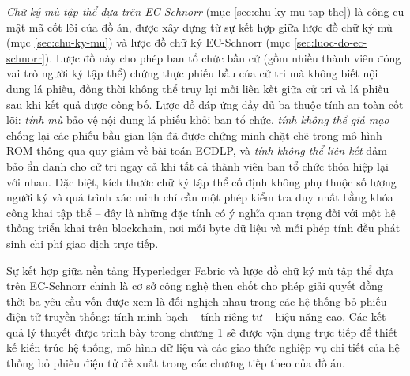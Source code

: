 \textit{Chữ ký mù tập thể dựa trên EC-Schnorr} (mục \ref{sec:chu-ky-mu-tap-the}) là công cụ mật mã cốt lõi của đồ án, được xây dựng từ sự kết hợp giữa lược đồ chữ ký mù (mục \ref{sec:chu-ky-mu}) và lược đồ chữ ký EC-Schnorr (mục \ref{sec:luoc-do-ec-schnorr}). Lược đồ này cho phép ban tổ chức bầu cử (gồm nhiều thành viên đóng vai trò người ký tập thể) chứng thực phiếu bầu của cử tri mà không biết nội dung lá phiếu, đồng thời không thể truy lại mối liên kết giữa cử tri và lá phiếu sau khi kết quả được công bố. Lược đồ đáp ứng đầy đủ ba thuộc tính an toàn cốt lõi: \textit{tính mù} bảo vệ nội dung lá phiếu khỏi ban tổ chức, \textit{tính không thể giả mạo} chống lại các phiếu bầu gian lận đã được chứng minh chặt chẽ trong mô hình ROM thông qua quy giảm về bài toán ECDLP, và \textit{tính không thể liên kết} đảm bảo ẩn danh cho cử tri ngay cả khi tất cả thành viên ban tổ chức thỏa hiệp lại với nhau. Đặc biệt, kích thước chữ ký tập thể cố định không phụ thuộc số lượng người ký và quá trình xác minh chỉ cần một phép kiểm tra duy nhất bằng khóa công khai tập thể -- đây là những đặc tính có ý nghĩa quan trọng đối với một hệ thống triển khai trên blockchain, nơi mỗi byte dữ liệu và mỗi phép tính đều phát sinh chi phí giao dịch trực tiếp.

Sự kết hợp giữa nền tảng Hyperledger Fabric và lược đồ chữ ký mù tập thể dựa trên EC-Schnorr chính là cơ sở công nghệ then chốt cho phép giải quyết đồng thời ba yêu cầu vốn được xem là đối nghịch nhau trong các hệ thống bỏ phiếu điện tử truyền thống: tính minh bạch -- tính riêng tư -- hiệu năng cao. Các kết quả lý thuyết được trình bày trong chương 1 sẽ được vận dụng trực tiếp để thiết kế kiến trúc hệ thống, mô hình dữ liệu và các giao thức nghiệp vụ chi tiết của hệ thống bỏ phiếu điện tử đề xuất trong các chương tiếp theo của đồ án.
